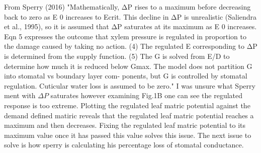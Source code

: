 \documentclass[a4paper]{article}\usepackage[]{graphicx}\usepackage[]{color}
\begin{document}
From Sperry (2016) "Mathematically, ΔP rises to a maximum before decreasing back to zero as E 0 increases to Ecrit. This decline in ΔP is unrealistic (Saliendra et al., 1995), so it is assumed that ΔP saturates at its maximum as E 0 increases. Eqn 5 expresses the outcome that xylem pressure is regulated in proportion to the damage caused by taking no action. (4) The regulated E corresponding to ΔP is determined from the supply function. (5) The G is solved from E/D to determine how much it is reduced below Gmax. The model does not partition G into stomatal vs boundary layer com- ponents, but G is controlled by stomatal regulation. Cuticular water loss is assumed to be zero." I was unsure what Sperry ment with $\Delta P$ saturates however examining Fig.1B one can see the regulated response is too extreme. Plotting the regulated leaf matric potential against the demand defined matiric reveals that the regulated leaf matric potential reaches a maximum and then decreases. Fixing the regulated leaf matric potential to its maximum value once it has passed this value solves this issue. The next issue to solve is how sperry is calculating his percentage loss of stomatal conductance.  



\end{document}
